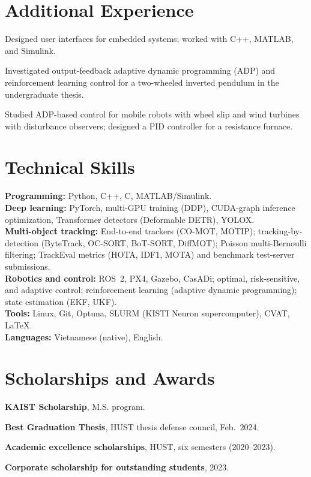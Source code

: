 \section{Additional Experience}
\cvItemsStart
\item Designed user interfaces for embedded systems; worked with C++, MATLAB, and Simulink.
\cvItemsEnd
{}
\cvItemsStart
\item Investigated output-feedback adaptive dynamic programming (ADP) and reinforcement learning control for a two-wheeled inverted pendulum in the undergraduate thesis.
\item Studied ADP-based control for mobile robots with wheel slip and wind turbines with disturbance observers; designed a PID controller for a resistance furnace.
\cvItemsEnd

\section{Technical Skills}
\textbf{Programming:} Python, C++, C, MATLAB/Simulink.\\[2pt]
\textbf{Deep learning:} PyTorch, multi-GPU training (DDP), CUDA-graph inference optimization, Transformer detectors (Deformable DETR), YOLOX.\\[2pt]
\textbf{Multi-object tracking:} End-to-end trackers (CO-MOT, MOTIP); tracking-by-detection (ByteTrack, OC-SORT, BoT-SORT, DiffMOT); Poisson multi-Bernoulli filtering; TrackEval metrics (HOTA, IDF1, MOTA) and benchmark test-server submissions.\\[2pt]
\textbf{Robotics and control:} ROS~2, PX4, Gazebo, CasADi; optimal, risk-sensitive, and adaptive control; reinforcement learning (adaptive dynamic programming); state estimation (EKF, UKF).\\[2pt]
\textbf{Tools:} Linux, Git, Optuna, SLURM (KISTI Neuron supercomputer), CVAT, \LaTeX.\\[2pt]
\textbf{Languages:} Vietnamese (native), English.

\section{Scholarships and Awards}
\cvItemsStart
\item \textbf{KAIST Scholarship}, M.S. program.
\item \textbf{Best Graduation Thesis}, HUST thesis defense council, Feb.\ 2024.
\item \textbf{Academic excellence scholarships}, HUST, six semesters (2020--2023).
\item \textbf{Corporate scholarship for outstanding students}, 2023.
\cvItemsEnd

